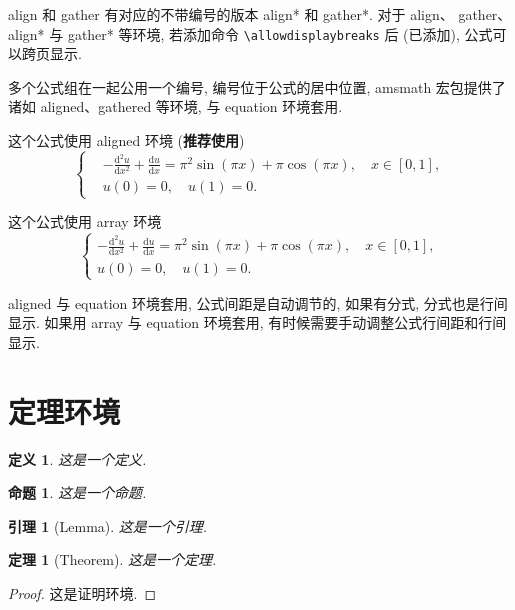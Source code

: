 \documentclass[UTF8,openany,twoside,12pt]{book}
\theoremstyle{plain}
\newtheorem{definition}{定义}[chapter]
\newtheorem{proposition}{命题}[chapter]
\newtheorem{lemma}{引理}[chapter]
\newtheorem{theorem}{定理}[chapter]
\begin{document}
align 和 gather 有对应的不带编号的版本 align* 和 gather*.
对于 align、 gather、align* 与 gather* 等环境, 若添加命令 \verb|\allowdisplaybreaks| 后 (已添加), 公式可以跨页显示.

多个公式组在一起公用一个编号, 编号位于公式的居中位置, amsmath 宏包提供了诸如 aligned、gathered 等环境, 与 equation 环境套用.

这个公式使用 aligned 环境 (\textbf{推荐使用})
\begin{equation}\label{eqn:1}
\left\{\begin{aligned}
  &-\frac{\mathrm{d}^{2} u}{\mathrm{d} x^{2}}+\frac{\mathrm{d} u}{\mathrm{d} x}=\pi^{2} \sin (\pi x)+\pi \cos (\pi x),\quad x \in [0,1], \\
  &u(0)=0,\quad u(1)=0.
\end{aligned} \right.
\end{equation}

这个公式使用 array 环境
\begin{equation}\label{eqn:2}
\left\{\begin{array}{l}
\displaystyle
-\frac{\mathrm{d}^{2} u}{\mathrm{d} x^{2}}+\frac{\mathrm{d} u}{\mathrm{d} x}=\pi^{2} \sin (\pi x)+\pi \cos (\pi x),\quad x \in [0,1], \\[6pt]
u(0)=0,\quad u(1)=0.
\end{array} \right.
\end{equation}

aligned 与 equation 环境套用, 公式间距是自动调节的, 如果有分式, 分式也是行间显示. 如果用 array 与 equation 环境套用, 有时候需要手动调整公式行间距和行间显示.



\section{定理环境}

\begin{definition}
这是一个定义.
\end{definition}

\begin{proposition}
这是一个命题.
\end{proposition}

\begin{lemma}[Lemma] \label{lemma1}
这是一个引理.
\end{lemma}

\begin{theorem}[Theorem]
这是一个定理.
\end{theorem}
\begin{proof}
这是证明环境.
\end{proof}
\end{document}
